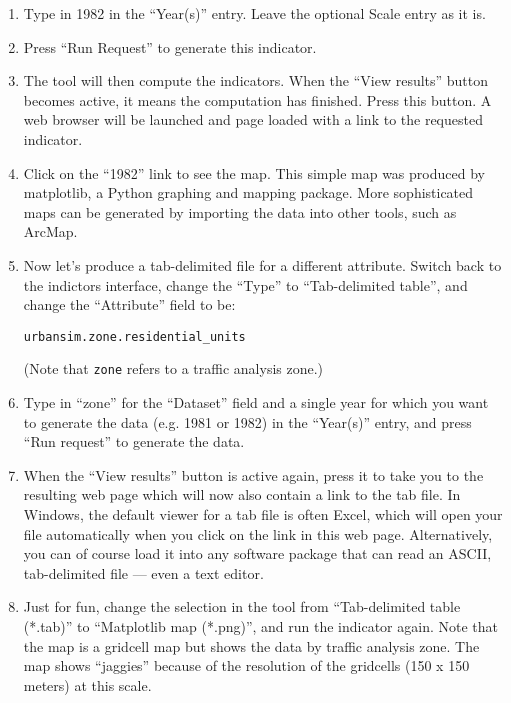 \documentclass{howto}
\begin{document}
\begin{enumerate}
\item Type in 1982 in the ``Year(s)'' entry. Leave the optional Scale entry as it is.

\item Press ``Run Request'' to generate this indicator.

\item The tool will then compute the indicators. When the
``View results'' button becomes active, it means the computation has finished.
Press this button. A web
browser will be launched and page loaded with a link to the requested indicator.

\item Click on the ``1982'' link to see the map. This simple map was
produced by matplotlib, a Python graphing and mapping package.  More
sophisticated maps can be generated by importing the data into other
tools, such as ArcMap.

\item Now let's produce a tab-delimited file for a different
attribute. Switch back to the indictors interface, change the ``Type'' 
to ``Tab-delimited table'', and change the
``Attribute'' field to be:

\begin{verbatim}
urbansim.zone.residential_units
\end{verbatim}

(Note that \verb|zone| refers to a traffic analysis zone.)

\item Type in ``zone'' for the ``Dataset'' field and a single year for 
which you want to generate the data (e.g. 1981 or 1982) in the ``Year(s)'' 
entry,  and press ``Run request'' to generate the data.

\item When the ``View results'' button is active again, press it to
take you to the resulting web page which will now also contain a link
to the tab file.  In Windows, the default viewer for a tab file is
often Excel, which will open your file automatically when you click on
the link in this web page. Alternatively, you can of course load it
into any software package that can read an ASCII, tab-delimited file
--- even a text editor.

\item Just for fun, change the selection in the tool from
``Tab-delimited table (*.tab)'' to ``Matplotlib map (*.png)'', and
run the indicator again.  Note that the map is a gridcell map but
shows the data by traffic analysis zone.  The map shows ``jaggies''
because of the resolution of the gridcells (150 x 150 meters) at
this scale.


\end{enumerate}
\end{document}
